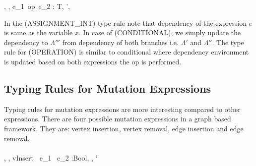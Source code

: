     {\Gamma, \Lambda, \Delta \vdash e_1~op~e_2 : T, \Lambda', \Delta}

\smallskip

In the (ASSIGNMENT\_INT) type rule note that dependency of the expression $e$ is same as the variable $x$. In case of (CONDITIONAL), we simply update the dependency to $\Lambda'''$ from dependency of both branches i.e. $\Lambda'$ and $\Lambda''$. The type rule for (OPERATION) is similar to conditional where dependency environment is updated based on both expressions the op is performed.\\    

 \subsection{Typing Rules for Mutation Expressions}
\label{subsec:standardRules}

Typing rules for mutation expressions are more interesting compared to other expressions. There are four possible mutation expressions in a graph based framework. They are: vertex insertion, vertex removal, edge insertion and edge removal. 
\ \\
\ \\
    {\Gamma, \Lambda, \Delta \vdash vInsert \ e_1 \ e_2 :Bool, \Lambda, \Delta'}

\smallskip

